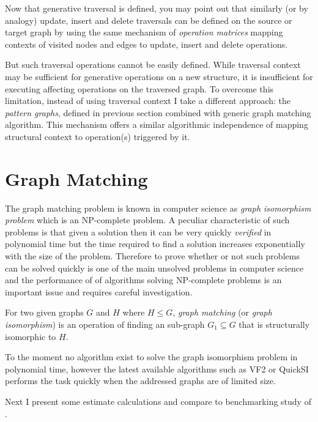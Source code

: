 Now that generative traversal is defined, you may point out that similarly (or by analogy) update, insert and delete traversals can be defined on the source or target graph by using the same mechanism of \textit{operation matrices} mapping contexts of visited nodes and edges to update, insert and delete operations. 

But such traversal operations cannot be easily defined. While traversal context may be sufficient for generative operations on a new structure, it is insufficient for executing affecting operations on the traversed graph. To overcome this limitation, instead of using traversal context I take a different approach: the \textit{pattern graphs}, defined in previous section combined with generic graph matching algorithm. This mechanism offers a similar algorithmic independence of mapping structural context to operation(s) triggered by it. 

\section{Graph Matching}
\label{sec:graph-matching}
The graph matching problem is known in computer science as \textit{graph isomorphism problem} which is an NP-complete problem. 
A peculiar characteristic of such problems is that given a solution then it can be very quickly \textit{verified} in polynomial time but the time required to find a solution increases exponentially with the size of the problem. Therefore to prove whether or not such problems can be solved quickly is one of the main unsolved problems in computer science and the performance of of algorithms solving NP-complete problems is an important issue and requires careful investigation. 

\begin{definition}\label{def:gmatching}
For two given graphs $G$ and $H$ where $H \leq G$, \textit{graph matching} (or \textit{graph isomorphism}) is an operation of finding an sub-graph $G_{1} \subseteq G$ that is structurally isomorphic to $H$.
\end{definition}

To the moment no algorithm exist to solve the graph isomorphism problem in polynomial time, however the latest available algorithms such as VF2 \cite{Cordella2001,Cordella2004} or QuickSI \cite{Shang2008} performs the task quickly when the addressed graphs are of limited size. 

Next I present some estimate calculations and compare to benchmarking study of \citet{Lee2013}.
 
